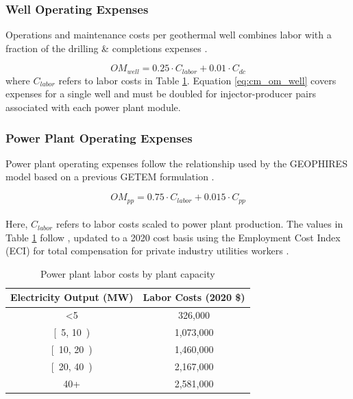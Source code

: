 \subsubsection{Well Operating Expenses}\label{ch4:cm_opex_well}
Operations and maintenance costs per geothermal well combines labor with a fraction of the drilling \& completions expenses \citep[Equation 12,\ ][]{beckers_introducing_2013}.

\begin{equation}
\label{eq:cm_om_well}
    OM_{well} = 0.25 \cdot C_{labor} + 0.01 \cdot C_{dc}
\end{equation}
where $C_{labor}$ refers to labor costs in Table \ref{tab:labor_costs}. Equation \ref{eq:cm_om_well} covers expenses for a single well and must be doubled for injector-producer pairs associated with each power plant module.

\subsubsection{Power Plant Operating Expenses}\label{ch4:cm_opex_pp}
Power plant operating expenses follow the relationship used by the GEOPHIRES model based on a previous GETEM formulation \citep[Equation 9,\ ][]{beckers_introducing_2013}.

\begin{equation}
\label{eq:cm_om_pp}
    OM_{pp} = 0.75 \cdot C_{labor} + 0.015 \cdot C_{pp}
\end{equation}
\\
Here, $C_{labor}$ refers to labor costs scaled to power plant production. The values in Table \ref{tab:labor_costs} follow \citet[Equation 10,\ ][]{beckers_introducing_2013}, updated to a 2020 cost basis using the Employment Cost Index (ECI) for total compensation for private industry utilities workers \citep{us_bls_eci_2021}.

\begin{table}[!htp]
\centering
\begin{tabular}{|c|c|}
\hline
\textbf{Electricity Output (MW)} & \textbf{Labor Costs (2020 \$)} \\ \hline
\textless 5 & 326,000 \\ \hline
{[}\ 5, 10\ ) & 1,073,000 \\ \hline
{[}\ 10, 20\ ) & 1,460,000 \\ \hline
{[}\ 20, 40\ ) & 2,167,000 \\ \hline
40+ & 2,581,000 \\ \hline
\end{tabular}
\caption[Power plant labor costs]{Power plant labor costs by plant capacity  \protect\citep{beckers_introducing_2013}}
\label{tab:labor_costs}
\end{table}

